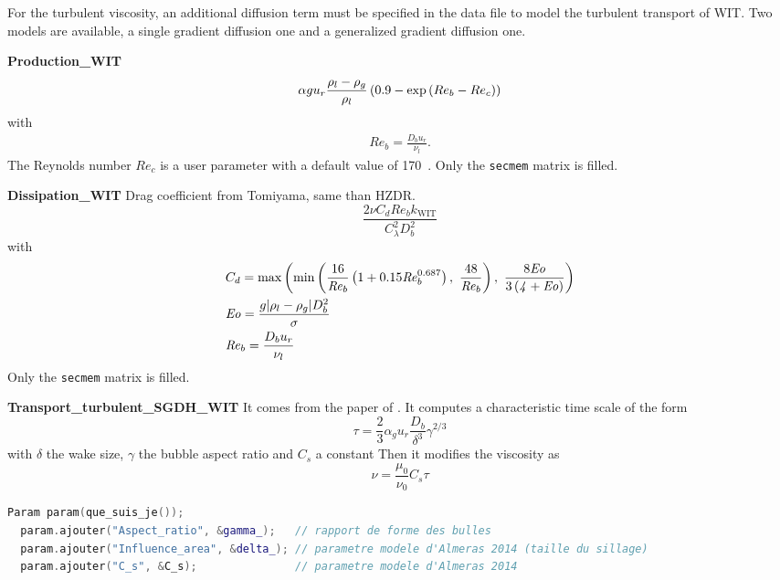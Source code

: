 For the turbulent viscosity, an additional diffusion term must be specified in the data file to model the turbulent transport of WIT. Two models are available, a single gradient diffusion one and a generalized gradient diffusion one.



\textbf{Production_WIT}
\begin{equation}
    \alpha{}g u_r\frac{\rho_l - \rho_g}{\rho_l}\left( 0.9 - \exp\left( Re_b-Re_c \right) \right)
\end{equation}
with
\begin{align}
    \mathit{Re}_b = \frac{D_b u_r}{\nu_l}.
\end{align}
The Reynolds number $\mathit{Re}_c$ is a user parameter with a default value of 170~\cite{DuCluzeau2019}. Only the \texttt{secmem} matrix is filled.



\textbf{Dissipation_WIT}
Drag coefficient from Tomiyama, same than HZDR.
\begin{equation}
    \frac{2\nu C_d \mathit{Re}_b k_{\text{WIT}}}{C_{\lambda}^2 D_b^2}
\end{equation}
with
\begin{align}
    &C_d = \max\parent{\min\parent{\frac{16}{\mathit{Re}_b}\parent{1+0.15\mathit{Re}_b^{0.687}},\ \frac{48}{\mathit{Re}_b}},\ \frac{8\mathit{Eo}}{3\parent{\mathit{4+Eo}}}}\\
    &\mathit{Eo} = \frac{g\norm{\rho_l - \rho_g}D_b^2}{\sigma}\\
    &\mathit{Re}_b = \frac{D_b u_r}{\nu_l}
\end{align}
 Only the \texttt{secmem} matrix is filled.



\textbf{Transport_turbulent_SGDH_WIT}
It comes from the paper of \textcite{Almeras2014}.
It computes a characteristic time scale of the form
\begin{equation}
    \tau = \frac{2}{3} \alpha_g u_r \frac{D_b}{\delta^3} \gamma^{2/3}
\end{equation}
with $\delta$ the wake size, $\gamma$ the bubble aspect ratio and $C_s$ a constant
Then it modifies the viscosity as
\begin{equation}
    \nu = \frac{\mu_0}{\nu_0}C_s \tau
\end{equation}

\begin{lstlisting}[language=c++]
  Param param(que_suis_je());
  param.ajouter("Aspect_ratio", &gamma_);   // rapport de forme des bulles
  param.ajouter("Influence_area", &delta_); // parametre modele d'Almeras 2014 (taille du sillage)
  param.ajouter("C_s", &C_s);               // parametre modele d'Almeras 2014
\end{lstlisting}



